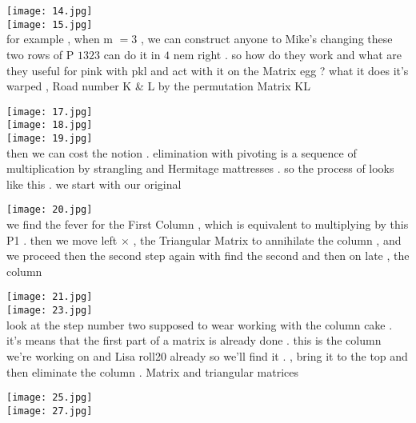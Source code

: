 \documentclass{article}
\begin{document}
\texttt{[image: 14.jpg]}\\



\texttt{[image: 15.jpg]}\\

for example , when m $=3$ , we can construct anyone to Mike's changing these two rows of P $1323$ can do it in $4$ nem right . so how do they work and what are they useful for pink with pkl and act with it on the Matrix egg ? what it does it's warped , Road number K & L by the permutation Matrix KL

\texttt{[image: 17.jpg]}\\



\texttt{[image: 18.jpg]}\\



\texttt{[image: 19.jpg]}\\

then we can cost the notion . elimination with pivoting is a sequence of multiplication by strangling and Hermitage mattresses . so the process of looks like this . we start with our original

\texttt{[image: 20.jpg]}\\

we find the fever for the First Column , which is equivalent to multiplying by this P1 . then we move left $\times$ , the Triangular Matrix to annihilate the column , and we proceed then the second step again with find the second and then on late , the column

\texttt{[image: 21.jpg]}\\



\texttt{[image: 23.jpg]}\\

look at the step number two supposed to wear working with the column cake . it's means that the first part of a matrix is already done . this is the column we're working on and Lisa roll20 already so we'll find it . , bring it to the top and then eliminate the column . Matrix and triangular matrices

\texttt{[image: 25.jpg]}\\



\texttt{[image: 27.jpg]}\\
\end{document}
